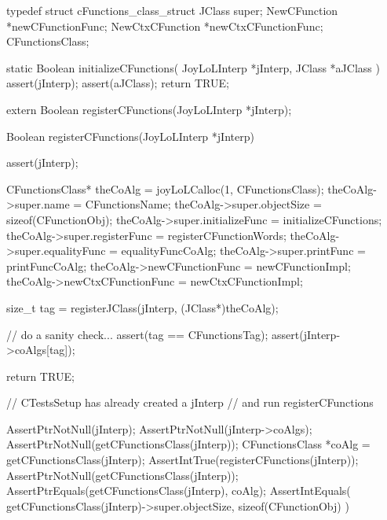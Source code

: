 \startTestSuite[registerCFunctions]

\startCHeader
typedef struct cFunctions_class_struct {
  JClass           super;
  NewCFunction    *newCFunctionFunc;
  NewCtxCFunction *newCtxCFunctionFunc;
} CFunctionsClass;
\stopCHeader

\startCCode
static Boolean initializeCFunctions(
  JoyLoLInterp *jInterp,
  JClass   *aJClass
) {
  assert(jInterp);
  assert(aJClass);
  return TRUE;
}
\stopCCode

\startCHeader
extern Boolean registerCFunctions(JoyLoLInterp *jInterp);
\stopCHeader
{}

\startCCode
Boolean registerCFunctions(JoyLoLInterp *jInterp) {
  assert(jInterp);
  
  CFunctionsClass* theCoAlg    =
    joyLoLCalloc(1, CFunctionsClass);
  theCoAlg->super.name           = CFunctionsName;
  theCoAlg->super.objectSize     = sizeof(CFunctionObj);
  theCoAlg->super.initializeFunc = initializeCFunctions;
  theCoAlg->super.registerFunc   = registerCFunctionWords;
  theCoAlg->super.equalityFunc   = equalityFuncCoAlg;
  theCoAlg->super.printFunc      = printFuncCoAlg;
  theCoAlg->newCFunctionFunc     = newCFunctionImpl;
  theCoAlg->newCtxCFunctionFunc  = newCtxCFunctionImpl;
  
  size_t tag =
    registerJClass(jInterp, (JClass*)theCoAlg);

  // do a sanity check...
  assert(tag == CFunctionsTag);
  assert(jInterp->coAlgs[tag]);

  return TRUE;
}
\stopCCode


\startCTest
  // CTestsSetup has already created a jInterp
  // and run registerCFunctions
  
  AssertPtrNotNull(jInterp);
  AssertPtrNotNull(jInterp->coAlgs);
  AssertPtrNotNull(getCFunctionsClass(jInterp));
  CFunctionsClass *coAlg =
    getCFunctionsClass(jInterp);
  AssertIntTrue(registerCFunctions(jInterp));
  AssertPtrNotNull(getCFunctionsClass(jInterp));
  AssertPtrEquals(getCFunctionsClass(jInterp), coAlg);
  AssertIntEquals(
    getCFunctionsClass(jInterp)->super.objectSize,
    sizeof(CFunctionObj)
  )
\stopCTest
\stopTestCase
\stopTestSuite
